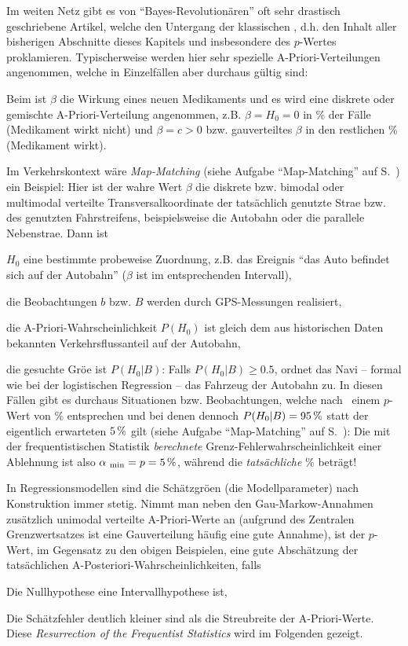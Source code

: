 Im weiten Netz gibt es von
``Bayes-Revolution\"aren'' oft sehr drastisch geschriebene Artikel,
welche den Untergang der klassischen , d.h. den Inhalt aller bisherigen Abschnitte dieses
Kapitels und insbesondere des $p$-Wertes proklamieren. Typischerweise
werden hier sehr spezielle A-Priori-Verteilungen angenommen, welche in
Einzelf\"allen aber durchaus g\"ultig sind:
\bi
\item Beim
ist $\beta$ die Wirkung eines neuen Medikaments und es wird eine
diskrete oder gemischte A-Priori-Verteilung angenommen,
z.B. $\beta=H_0=0$ in \unit[90]{\%} der F\"alle (Medikament wirkt nicht)
und $\beta=c>0$ bzw. gau\3verteiltes $\beta$ in den restlichen
\unit[10]{\%} (Medikament wirkt). 
\item Im Verkehrskontext w\"are \emph{Map-Matching} (siehe Aufgabe
  ``Map-Matching'' auf
  S.~\pageref{aufg:MapMatching}) ein Beispiel: Hier
  ist der wahre Wert $\beta$ die diskrete bzw. bimodal oder multimodal verteilte 
 Transversalkoordinate der
  tats\"achlich genutzte Stra\3e bzw. des genutzten Fahr\-strei\-fens, beispielsweise
  die Autobahn oder die parallele Nebenstra\3e. Dann ist
\bi
\item $H_0$ eine
  bestimmte probeweise Zuordnung, z.B. das Ereignis ``das Auto
  befindet sich auf der Autobahn'' ($\beta$ ist
  im entsprechenden Intervall), 
\item die Beobachtungen $b$ bzw. $B$ werden
  durch GPS-Messungen realisiert,
\item die A-Priori-Wahrscheinlichkeit $P(H_0)$ ist gleich dem
  aus historischen Daten bekannten Verkehrsflussanteil auf der Autobahn,
\item die gesuchte Gr\"o\3e ist  $P(H_0|B)$: Falls $P(H_0|B)\ge 0.5$,
  ordnet das Navi -- formal wie bei der logistischen Regression -- 
das Fahrzeug der Autobahn zu.
\ei 
\ei
In diesen F\"allen gibt es durchaus
Situationen bzw. Beobachtungen, welche 
nach~ einem
$p$-Wert von \unit[5]{\%} entsprechen und bei denen dennoch
$P(H_0|B)=\unit[95]{\%}$ statt der eigentlich erwarteten
$\unit[5]{\%}$ gilt (siehe Aufgabe ``Map-Matching''
  auf S.~\pageref{aufg:MapMatching}): Die mit der frequentistischen
  Statistik \emph{berechnete}
  Grenz-Fehler\-wahr\-schein\-lich\-keit 
einer Ablehnung ist
also $\alpha\sub{min}=p=\unit[5]{\%}$, w\"ahrend die
\emph{tats\"achliche} \unit[95]{\%} betr\"agt!

In Regressionsmodellen sind die Sch\"atzgr\"o\3en (die
Modellparameter) nach Konstruktion 
immer stetig. Nimmt man neben den Gau\3-Markow-Annahmen zus\"atzlich
unimodal verteilte A-Priori-Werte an (aufgrund des Zentralen Grenzwertsatzes ist
eine Gau\3verteilung h\"aufig eine gute Annahme), ist der $p$-Wert, im Gegensatz zu
den obigen Beispielen, eine gute Absch\"atzung der tats\"achlichen
A-Posteriori-Wahr\-schein\-lich\-keiten, falls
\bi
\item[(1)] Die Nullhypothese eine Intervallhypothese ist,
\item[(2)] Die Sch\"atzfehler deutlich kleiner sind als die
  Streubreite der A-Priori-Werte.
\ei
Diese \emph{Resurrection of the Frequentist Statistics} wird im Folgenden gezeigt.


